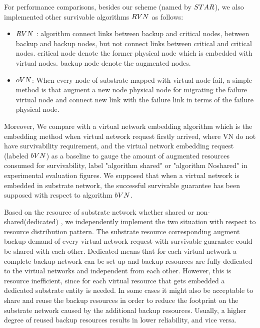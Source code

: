For performance comparisons, besides our scheme (named by $STAR$), we also implemented other survivable algorithms $RVN$ \cite{yeow2011designing} as follows:
\begin{itemize}
  \item $RVN$ : algorithm connect links between backup and critical nodes, between backup and backup nodes, but not connect links between critical and critical nodes. critical node denote the former physical node which is embedded with virtual nodes. backup node denote the augmented nodes.
  \item $oVN$: When every node of substrate mapped with virtual node fail, a simple method is that augment a new node physical node for migrating the failure virtual node and connect new link with the failure link in terms of the failure physical node.
\end{itemize}

Moreover, We compare with a virtual network embedding algorithm\cite{liu2011completing} which is the embedding method when virtual network request firstly arrived, where VN do not have survivability requirement, and the virtual network embedding request (labeled $bVN$) as a baseline to gauge the amount of augmented resources consumed for survivability, label "algorithm shared" or "algorithm Noshared" in experimental evaluation figures. We supposed that when a virtual network is embedded in substrate network, the successful survivable guarantee has been supposed  with respect to algorithm $bVN$.

Based on the resource of substrate network whether shared or non-shared(dedicated) \cite{lu2006efficient}, we independently implement the two situation with respect to resource distribution pattern. The substrate resource corresponding augment backup demand of  every virtual network request with survivable guarantee  could be shared with each other. Dedicated means that for each virtual network a
complete backup network can be set up and backup resources are fully dedicated to the virtual networks and independent from each other. However, this is resource inefficient, since for each virtual resource that gets embedded a dedicated substrate entity is needed. In some cases it might also be acceptable to share and reuse the backup resources in order to reduce the footprint on the substrate network caused by the additional
backup resources. Usually, a higher degree of reused backup resources results in lower reliability, and vice versa.

